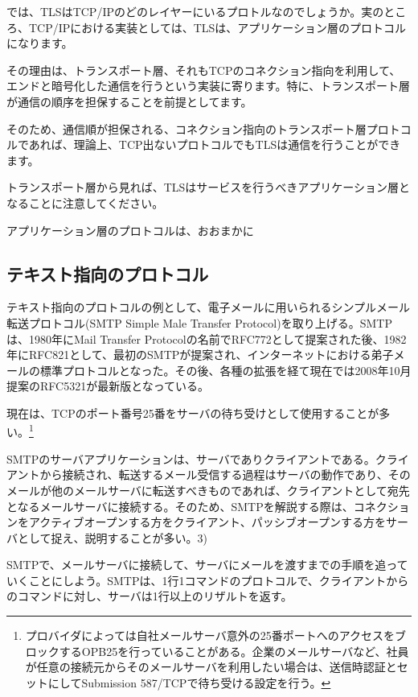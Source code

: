 では、TLSはTCP/IPのどのレイヤーにいるプロトルなのでしょうか。実のところ、TCP/IPにおける実装としては、TLSは、アプリケーション層のプロトコルになります。

その理由は、トランスポート層、それもTCPのコネクション指向を利用して、エンドと暗号化した通信を行うという実装に寄ります。特に、トランスポート層が通信の順序を担保することを前提としてます。

そのため、通信順が担保される、コネクション指向のトランスポート層プロトコルであれば、理論上、TCP出ないプロトコルでもTLSは通信を行うことができます。

トランスポート層から見れば、TLSはサービスを行うべきアプリケーション層となることに注意してください。



アプリケーション層のプロトコルは、おおまかに

\subsection{テキスト指向のプロトコル}

テキスト指向のプロトコルの例として、電子メールに用いられるシンプルメール転送プロトコル(SMTP Simple Male Transfer Protocol)を取り上げる。SMTPは、1980年にMail Transfer Protocolの名前でRFC772として提案された後、1982年にRFC821として、最初のSMTPが提案され、インターネットにおける弟子メールの標準プロトコルとなった。その後、各種の拡張を経て現在では2008年10月提案のRFC5321が最新版となっている。

現在は、TCPのポート番号25番をサーバの待ち受けとして使用することが多い。\footnote{プロバイダによっては自社メールサーバ意外の25番ポートへのアクセスをブロックするOPB25を行っていることがある。企業のメールサーバなど、社員が任意の接続元からそのメールサーバを利用したい場合は、送信時認証とセットにしてSubmission 587/TCPで待ち受ける設定を行う。}

SMTPのサーバアプリケーションは、サーバでありクライアントである。クライアントから接続され、転送するメール受信する過程はサーバの動作であり、そのメールが他のメールサーバに転送すべきものであれば、クライアントとして宛先となるメールサーバに接続する。そのため、SMTPを解説する際は、コネクションをアクティブオープンする方をクライアント、パッシブオープンする方をサーバとして捉え、説明することが多い。3)

SMTPで、メールサーバに接続して、サーバにメールを渡すまでの手順を追っていくことにしよう。SMTPは、1行1コマンドのプロトコルで、クライアントからのコマンドに対し、サーバは1行以上のリザルトを返す。

